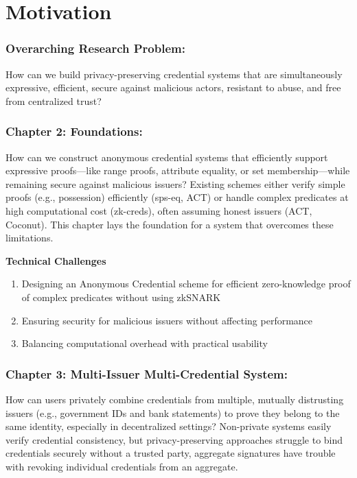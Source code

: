 \newpage
\section{Motivation}
\subsubsection*{Overarching Research Problem: }
How can we build privacy-preserving credential systems that are simultaneously expressive, efficient, secure against malicious actors, resistant to abuse, and free from centralized trust?


\subsubsection*{Chapter 2: Foundations: } 
How can we construct anonymous credential systems that efficiently support expressive proofs—like range proofs, attribute equality, or set membership—while remaining secure against malicious issuers? Existing schemes either verify simple proofs (e.g., possession) efficiently (sps-eq, ACT) or handle complex predicates at high computational cost (zk-creds), often assuming honest issuers (ACT, Coconut). This chapter lays the foundation for a system that overcomes these limitations.

\noindent \textbf{Technical Challenges}
\begin{enumerate}
    \item Designing an Anonymous Credential scheme for efficient zero-knowledge proof of complex predicates without using zkSNARK
    \item Ensuring security for malicious issuers without affecting performance
    \item Balancing computational overhead with practical usability
\end{enumerate}

\subsubsection*{Chapter 3: Multi-Issuer Multi-Credential System: } 
How can users privately combine credentials from multiple, mutually distrusting issuers (e.g., government IDs and bank statements) to prove they belong to the same identity, especially in decentralized settings? Non-private systems easily verify credential consistency, but privacy-preserving approaches struggle to bind credentials securely without a trusted party, aggregate signatures \cite{mir_aggregate_2023} have trouble with revoking individual credentials from an aggregate.

